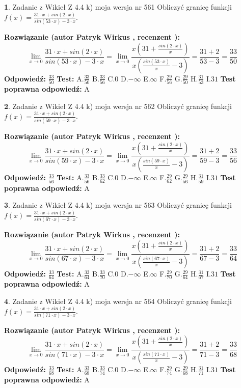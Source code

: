 \documentclass[12pt, a4paper]{article}
\theoremstyle{definition} %
\newtheorem{zad}{}
\newcommand{\zadStart}[1]{\begin{zad}#1\newline}
\newcommand{\zadStop}{\end{zad}}
\newcommand{\rozwStart}[2]{\noindent \textbf{Rozwiązanie (autor #1 , recenzent #2): }\newline}
\newcommand{\rozwStop}{\newline}
\newcommand{\odpStart}{\noindent \textbf{Odpowiedź:}\newline}
\newcommand{\odpStop}{\newline}
\newcommand{\testStart}{\noindent \textbf{Test:}\newline}
\newcommand{\testStop}{\newline}
\newcommand{\kluczStart}{\noindent \textbf{Test poprawna odpowiedź:}\newline}
\newcommand{\kluczStop}{\newline}
\begin{document}
\zadStart{Zadanie z Wikieł Z 4.4 k) moja wersja nr 561}
Obliczyć granicę funkcji $f(x)=\frac{31\cdot x +sin(2\cdot x)}{sin(53\cdot x) -3\cdot x}$.
\zadStop
\rozwStart{Patryk Wirkus}{}
$$\lim\limits_{x\to 0}\frac{31\cdot x +sin(2\cdot x)}{sin(53\cdot x) -3\cdot x}
=\lim\limits_{x\to 0}\frac{x(31+\frac{sin(2\cdot x)}{x})}{x(\frac{sin(53\cdot x)}{x}-3)}
=\frac{31+2}{53-3} = \frac{33}{50}$$
\rozwStop
\odpStart
$\frac{33}{50}$
\odpStop
\testStart
A.$\frac{33}{50}$
B.$\frac{33}{56}$
C.$0$
D.$-\infty$
E.$\infty$
F.$\frac{29}{56}$
G.$\frac{29}{50}$
H.$\frac{31}{53}$
I.$31$
\testStop
\kluczStart
A
\kluczStop



\zadStart{Zadanie z Wikieł Z 4.4 k) moja wersja nr 562}
Obliczyć granicę funkcji $f(x)=\frac{31\cdot x +sin(2\cdot x)}{sin(59\cdot x) -3\cdot x}$.
\zadStop
\rozwStart{Patryk Wirkus}{}
$$\lim\limits_{x\to 0}\frac{31\cdot x +sin(2\cdot x)}{sin(59\cdot x) -3\cdot x}
=\lim\limits_{x\to 0}\frac{x(31+\frac{sin(2\cdot x)}{x})}{x(\frac{sin(59\cdot x)}{x}-3)}
=\frac{31+2}{59-3} = \frac{33}{56}$$
\rozwStop
\odpStart
$\frac{33}{56}$
\odpStop
\testStart
A.$\frac{33}{56}$
B.$\frac{33}{62}$
C.$0$
D.$-\infty$
E.$\infty$
F.$\frac{29}{62}$
G.$\frac{29}{56}$
H.$\frac{31}{59}$
I.$31$
\testStop
\kluczStart
A
\kluczStop



\zadStart{Zadanie z Wikieł Z 4.4 k) moja wersja nr 563}
Obliczyć granicę funkcji $f(x)=\frac{31\cdot x +sin(2\cdot x)}{sin(67\cdot x) -3\cdot x}$.
\zadStop
\rozwStart{Patryk Wirkus}{}
$$\lim\limits_{x\to 0}\frac{31\cdot x +sin(2\cdot x)}{sin(67\cdot x) -3\cdot x}
=\lim\limits_{x\to 0}\frac{x(31+\frac{sin(2\cdot x)}{x})}{x(\frac{sin(67\cdot x)}{x}-3)}
=\frac{31+2}{67-3} = \frac{33}{64}$$
\rozwStop
\odpStart
$\frac{33}{64}$
\odpStop
\testStart
A.$\frac{33}{64}$
B.$\frac{33}{70}$
C.$0$
D.$-\infty$
E.$\infty$
F.$\frac{29}{70}$
G.$\frac{29}{64}$
H.$\frac{31}{67}$
I.$31$
\testStop
\kluczStart
A
\kluczStop



\zadStart{Zadanie z Wikieł Z 4.4 k) moja wersja nr 564}
Obliczyć granicę funkcji $f(x)=\frac{31\cdot x +sin(2\cdot x)}{sin(71\cdot x) -3\cdot x}$.
\zadStop
\rozwStart{Patryk Wirkus}{}
$$\lim\limits_{x\to 0}\frac{31\cdot x +sin(2\cdot x)}{sin(71\cdot x) -3\cdot x}
=\lim\limits_{x\to 0}\frac{x(31+\frac{sin(2\cdot x)}{x})}{x(\frac{sin(71\cdot x)}{x}-3)}
=\frac{31+2}{71-3} = \frac{33}{68}$$
\rozwStop
\odpStart
$\frac{33}{68}$
\odpStop
\testStart
A.$\frac{33}{68}$
B.$\frac{33}{74}$
C.$0$
D.$-\infty$
E.$\infty$
F.$\frac{29}{74}$
G.$\frac{29}{68}$
H.$\frac{31}{71}$
I.$31$
\testStop
\kluczStart
A
\kluczStop
\end{document}
